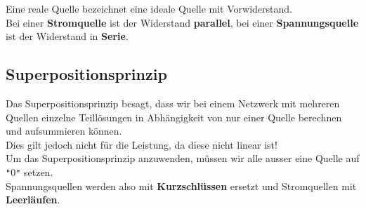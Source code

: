 										\beginip
										Eine reale Quelle bezeichnet eine ideale Quelle mit Vorwiderstand. \\
										Bei einer \textbf{Stromquelle} ist der Widerstand \textbf{parallel}, bei einer \textbf{Spannungsquelle} ist der Widerstand in \textbf{Serie}.
											\begin{center}
												\fix
											\end{center}
										\iend




																				\subsection{Superpositionsprinzip}

																				 Das Superpositionsprinzip besagt, dass wir bei einem Netzwerk mit mehreren Quellen einzelne Teillösungen in Abhängigkeit von nur einer Quelle berechnen und aufsummieren können. \\
																				 Dies gilt jedoch nicht für die Leistung, da diese nicht linear ist! \\
																				 Um das Superpositionsprinzip anzuwenden, müssen wir alle ausser eine Quelle auf \texttt{"}0\texttt{"} setzen. \\
																				 Spannungsquellen werden also mit \textbf{Kurzschlüssen} ersetzt und Stromquellen mit \textbf{Leerläufen}. \\
																				 \begin{center}
																				 	\fix
																				 \end{center}


